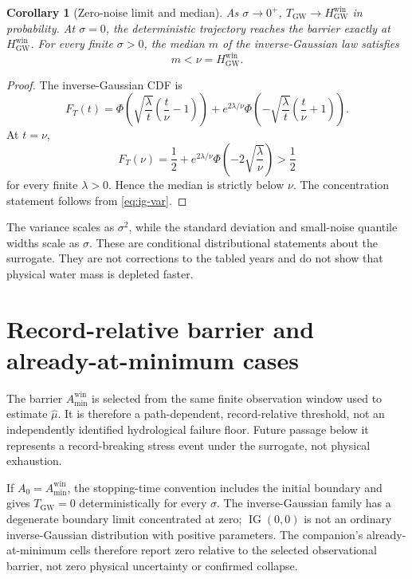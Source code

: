 \documentclass[11pt]{article}
\newtheorem{corollary}{Corollary}
\theoremstyle{definition}
\begin{document}
\begin{corollary}[Zero-noise limit and median]
\label{cor:median}
As $\sigma\to0^+$, $T_{\mathrm{GW}}\to H_{\mathrm{GW}}^{\mathrm{win}}$ in probability. At $\sigma=0$, the deterministic trajectory reaches the barrier exactly at $H_{\mathrm{GW}}^{\mathrm{win}}$. For every finite $\sigma>0$, the median $m$ of the inverse-Gaussian law satisfies
\[
m<\nu=H_{\mathrm{GW}}^{\mathrm{win}}.
\]
\end{corollary}

\begin{proof}
The inverse-Gaussian CDF is
\[
F_T(t)=
\Phi\!\left(\sqrt{\frac{\lambda}{t}}\left(\frac{t}{\nu}-1\right)\right)
+e^{2\lambda/\nu}
\Phi\!\left(-\sqrt{\frac{\lambda}{t}}\left(\frac{t}{\nu}+1\right)\right).
\]
At $t=\nu$,
\[
F_T(\nu)=\frac12+e^{2\lambda/\nu}\Phi\!\left(-2\sqrt{\frac{\lambda}{\nu}}\right)>\frac12
\]
for every finite $\lambda>0$. Hence the median is strictly below $\nu$. The concentration statement follows from \eqref{eq:ig-var}.\end{proof}

The variance scales as $\sigma^2$, while the standard deviation and small-noise quantile widths scale as $\sigma$. These are conditional distributional statements about the surrogate. They are not corrections to the tabled years and do not show that physical water mass is depleted faster.

\section{Record-relative barrier and already-at-minimum cases}
\label{sec:barrier}

The barrier $A_{\min}^{\mathrm{win}}$ is selected from the same finite observation window used to estimate $\widehat\mu$. It is therefore a path-dependent, record-relative threshold, not an independently identified hydrological failure floor. Future passage below it represents a record-breaking stress event under the surrogate, not physical exhaustion.

If $A_0=A_{\min}^{\mathrm{win}}$, the stopping-time convention includes the initial boundary and gives $T_{\mathrm{GW}}=0$ deterministically for every $\sigma$. The inverse-Gaussian family has a degenerate boundary limit concentrated at zero; $\operatorname{IG}(0,0)$ is not an ordinary inverse-Gaussian distribution with positive parameters. The companion's already-at-minimum cells therefore report zero relative to the selected observational barrier, not zero physical uncertainty or confirmed collapse.
\end{document}
